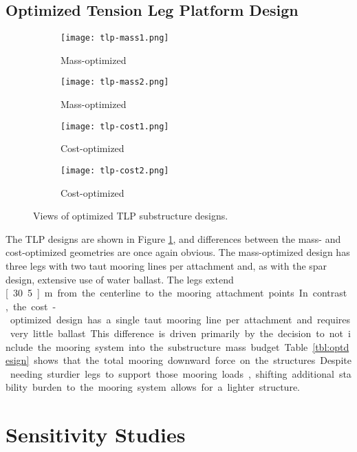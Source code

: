 \subsection{Optimized Tension Leg Platform Design}

\begin{figure}[htb]
  \begin{subfigure}[b]{0.24\linewidth}
    \centering \texttt{[image: tlp-mass1.png]}
    \caption{Mass-optimized}
  \end{subfigure}
  \begin{subfigure}[b]{0.24\linewidth}
    \centering \texttt{[image: tlp-mass2.png]}
    \caption{Mass-optimized}
  \end{subfigure}
  \begin{subfigure}[b]{0.24\linewidth}
    \centering \texttt{[image: tlp-cost1.png]}
    \caption{Cost-optimized}
  \end{subfigure}
  \begin{subfigure}[b]{0.24\linewidth}
    \centering \texttt{[image: tlp-cost2.png]}
    \caption{Cost-optimized}
  \end{subfigure}
  \caption{Views of optimized TLP substructure designs.}
  \label{fig:tlp-design}
\end{figure}

The TLP designs are shown in Figure \ref{fig:tlp-design}, and
differences between the mass- and cost-optimized geometries are once
again obvious.  The mass-optimized design has three legs with two taut
mooring lines per attachment and, as with the spar design, extensive use
of water ballast.  The legs extend \unit[30.5]{m} from the centerline to
the mooring attachment points.  In contrast, the cost-optimized design
has a single taut mooring line per attachment and requires very little
ballast.  This difference is driven primarily by the decision to not
include the mooring system into the substructure mass budget.  Table
\ref{tbl:optdesign} shows that the total mooring downward force on the
structures.  Despite needing sturdier legs to support those mooring
loads, shifting additional stability burden to the mooring system allows
for a lighter structure.

\section{Sensitivity Studies}

